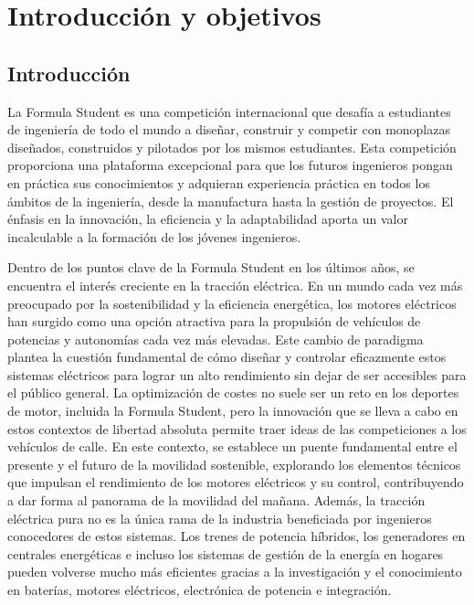 \chapter{Introducción y objetivos}

\section{Introducción}
La Formula Student es una competición internacional que desafía a estudiantes de ingeniería de todo el mundo a diseñar, construir y competir con monoplazas diseñados, construidos y pilotados por los mismos estudiantes. Esta competición proporciona una plataforma excepcional para que los futuros ingenieros pongan en práctica sus conocimientos y adquieran experiencia práctica en todos los ámbitos de la ingeniería, desde la manufactura hasta la gestión de proyectos. El énfasis en la innovación, la eficiencia y la adaptabilidad aporta un valor incalculable a la formación de los jóvenes ingenieros.

Dentro de los puntos clave de la Formula Student en los últimos años, se encuentra el interés creciente en la tracción eléctrica. En un mundo cada vez más preocupado por la sostenibilidad y la eficiencia energética, los motores eléctricos han surgido como una opción atractiva para la propulsión de vehículos de potencias y autonomías cada vez más elevadas. Este cambio de paradigma plantea la cuestión fundamental de cómo diseñar y controlar eficazmente estos sistemas eléctricos para lograr un alto rendimiento sin dejar de ser accesibles para el público general. La optimización de costes no suele ser un reto en los deportes de motor, incluida la Formula Student, pero la innovación que se lleva a cabo en estos contextos de libertad absoluta permite traer ideas de las competiciones a los vehículos de calle. En este contexto, se establece un puente fundamental entre el presente y el futuro de la movilidad sostenible, explorando los elementos técnicos que impulsan el rendimiento de los motores eléctricos y su control, contribuyendo a dar forma al panorama de la movilidad del mañana. Además, la tracción eléctrica pura no es la única rama de la industria beneficiada por ingenieros conocedores de estos sistemas. Los trenes de potencia híbridos, los generadores en centrales energéticas e incluso los sistemas de gestión de la energía en hogares pueden volverse mucho más eficientes gracias a la investigación y el conocimiento en baterías, motores eléctricos, electrónica de potencia e integración.

